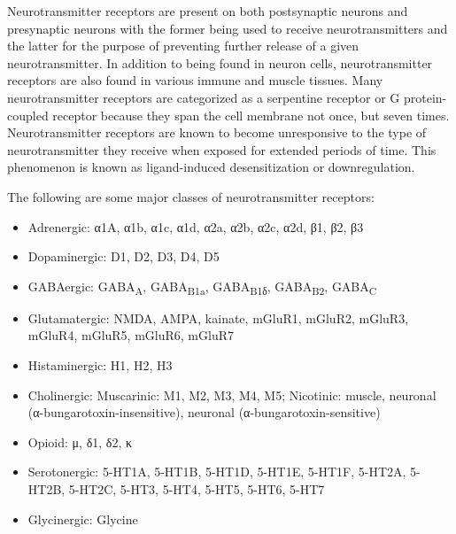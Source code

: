 Neurotransmitter receptors are present on both postsynaptic neurons and presynaptic neurons with the former being used to receive neurotransmitters and the latter for the purpose of preventing further release of a given neurotransmitter. In addition to being found in neuron cells, neurotransmitter receptors are also found in various immune and muscle tissues. Many neurotransmitter receptors are categorized as a serpentine receptor or G protein-coupled receptor because they span the cell membrane not once, but seven times. Neurotransmitter receptors are known to become unresponsive to the type of neurotransmitter they receive when exposed for extended periods of time. This phenomenon is known as ligand-induced desensitization or downregulation.

The following are some major classes of neurotransmitter receptors:

\begin{itemize}
\tightlist
\item
  Adrenergic: α1A, α1b, α1c, α1d, α2a, α2b, α2c, α2d, β1, β2, β3
\item
  Dopaminergic: D1, D2, D3, D4, D5
\item
  GABAergic: GABA\textsubscript{A}, GABA\textsubscript{B1a}, GABA\textsubscript{B1δ}, GABA\textsubscript{B2}, GABA\textsubscript{C}
\item
  Glutamatergic: NMDA, AMPA, kainate, mGluR1, mGluR2, mGluR3, mGluR4, mGluR5, mGluR6, mGluR7
\item
  Histaminergic: H1, H2, H3
\item
  Cholinergic: Muscarinic: M1, M2, M3, M4, M5; Nicotinic: muscle, neuronal (α-bungarotoxin-insensitive), neuronal (α-bungarotoxin-sensitive)
\item
  Opioid: μ, δ1, δ2, κ
\item
  Serotonergic: 5-HT1A, 5-HT1B, 5-HT1D, 5-HT1E, 5-HT1F, 5-HT2A, 5-HT2B, 5-HT2C, 5-HT3, 5-HT4, 5-HT5, 5-HT6, 5-HT7
\item
  Glycinergic: Glycine
\end{itemize}

